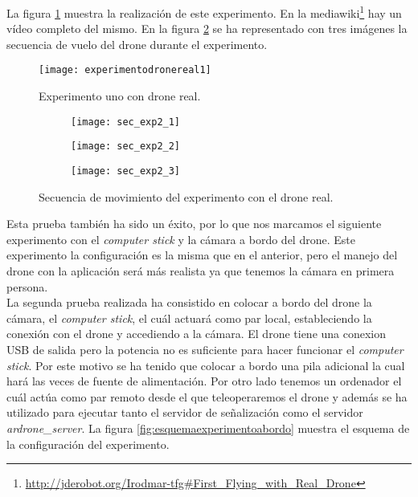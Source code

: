La figura \ref{fig:experimentodronereal1} muestra la realización de este experimento. En la mediawiki\footnote{\url{http://jderobot.org/Irodmar-tfg\#First\_Flying\_with\_Real\_Drone}}\cite{Mediawiki} hay un vídeo completo del mismo. En la figura \ref{fig:secexp2} se ha representado con tres imágenes la secuencia de vuelo del drone durante el experimento.\\

\begin{figure}[h!]
\centering
\texttt{[image: experimentodronereal1]}
\caption{Experimento uno con drone real.}
\label{fig:experimentodronereal1}
\end{figure}


\begin{figure}[h!]
\centering
  \begin{subfigure}[]{48mm}
    \texttt{[image: sec\_exp2\_1]}
  \end{subfigure}
  \hspace{1pt}
  \begin{subfigure}[]{48mm}
    \texttt{[image: sec\_exp2\_2]}
  \end{subfigure}
    \hspace{1pt}
    \begin{subfigure}[]{48mm}
    \texttt{[image: sec\_exp2\_3]}
  \end{subfigure}
    \caption{Secuencia de movimiento del experimento con el drone real.}
  \label{fig:secexp2}
\end{figure}


Esta prueba también ha sido un éxito, por lo que nos marcamos el siguiente experimento con el \emph{computer stick} y la cámara a bordo del drone. Este experimento la configuración es la misma que en el anterior, pero el manejo del drone con la aplicación será más realista ya que tenemos la cámara en primera persona.\\


La segunda prueba realizada ha consistido en colocar a bordo del drone la cámara, el \emph{computer stick}, el cuál actuará como par local, estableciendo la conexión con el drone y accediendo a la cámara. El drone tiene una conexion USB de salida pero la potencia no es suficiente para hacer funcionar el \emph{computer stick}. Por este motivo se ha tenido que colocar a bordo una pila adicional la cual hará las veces de fuente de alimentación. Por otro lado tenemos un ordenador el cuál actúa como par remoto desde el que teleoperaremos el drone y además se ha utilizado para ejecutar tanto el servidor de señalización como el servidor \emph{ardrone\_server}. La figura \ref{fig:esquemaexperimentoabordo} muestra el esquema de la configuración del experimento.\\


